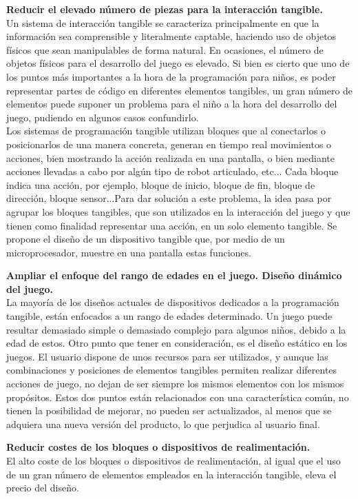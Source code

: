 \textbf{Reducir el elevado número de piezas para la interacción tangible.}\\
Un sistema de interacción tangible se caracteriza principalmente en que la información sea comprensible y literalmente captable, haciendo uso de objetos físicos que sean manipulables de forma natural. En ocasiones, el número de objetos físicos para el desarrollo del juego es elevado. Si bien es cierto que uno de los puntos más importantes a la hora de la programación para niños, es poder representar partes de código en diferentes elementos tangibles, un gran número de elementos puede suponer un problema para el niño a la hora del desarrollo del juego, pudiendo en algunos casos confundirlo.\\ 
Los sistemas de programación tangible utilizan bloques que al conectarlos o posicionarlos de una manera concreta, generan en tiempo real movimientos o acciones, bien mostrando la acción realizada en una pantalla, o bien mediante acciones llevadas a cabo por algún tipo de robot articulado, etc... Cada bloque indica una acción, por ejemplo, bloque de inicio, bloque de fin, bloque de dirección, bloque sensor...Para dar solución a este problema, la idea pasa por agrupar los bloques tangibles, que son utilizados en la interacción del juego y que tienen como finalidad representar una acción, en un solo elemento tangible. Se propone el diseño de un dispositivo tangible que, por medio de un microprocesador, muestre en una pantalla estas funciones.

\textbf{Ampliar el enfoque del rango de edades en el juego. Diseño dinámico del juego.}\\
La mayoría de los diseños actuales de dispositivos dedicados a la programación tangible, están enfocados a un rango de edades determinado. Un juego puede resultar demasiado simple o demasiado complejo para algunos niños, debido a la edad de estos. Otro punto que tener en consideración, es el diseño estático en los juegos. El usuario dispone de unos recursos para ser utilizados, y aunque las combinaciones y posiciones de elementos tangibles permiten realizar diferentes acciones de juego, no dejan de ser siempre los mismos elementos con los mismos propósitos. Estos dos puntos están relacionados con una característica común, no tienen la posibilidad de mejorar, no pueden ser actualizados, al menos que se adquiera una nueva versión del producto, lo que perjudica al usuario final.

\textbf{Reducir costes de los bloques o dispositivos de realimentación.}\\
El alto coste de los bloques o dispositivos de realimentación, al igual que el uso de un gran número de elementos empleados en la interacción tangible, eleva el precio del diseño.\\



